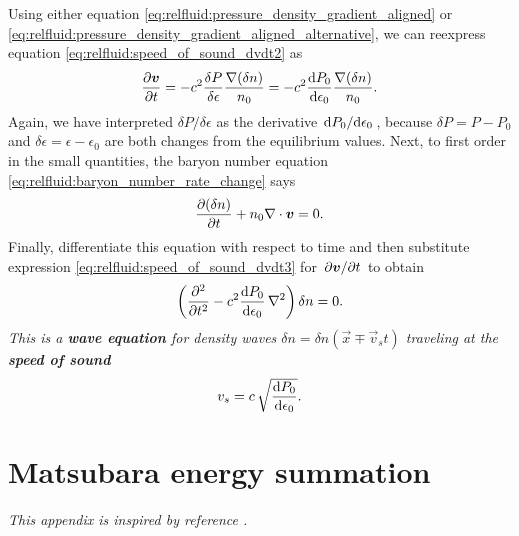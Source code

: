 Using either equation \eqref{eq:relfluid:pressure_density_gradient_aligned} or \eqref{eq:relfluid:pressure_density_gradient_aligned_alternative}, we can reexpress equation \eqref{eq:relfluid:speed_of_sound_dvdt2} as
\begin{equation}
	\pdv{\vec{v}}{t} = -c^2 \frac{\delta P}{\delta \epsilon} \frac{\nabla (\delta n)}{n_0}
	                 = -c^2 \odv{P_0}{\epsilon_0} \frac{\nabla (\delta n)}{n_0} .
\label{eq:relfluid:speed_of_sound_dvdt3}
\end{equation}
Again, we have interpreted $\delta P / \delta \epsilon$ as the derivative $\odv{P_0}/{\epsilon_0}$, because $\delta P = P - P_0$ and $\delta \epsilon = \epsilon - \epsilon_0$ are both changes from the equilibrium values.
Next, to first order in the small quantities, the baryon number equation \eqref{eq:relfluid:baryon_number_rate_change} says
\begin{equation}
	\pdv{(\delta n)}{t} + n_0 \nabla \cdot {\bm{v}} = 0 .
\label{eq:relfluid:speed_of_sound_baryon_number_rate_of_change}
\end{equation}
Finally, differentiate this equation with respect to time and then substitute expression \eqref{eq:relfluid:speed_of_sound_dvdt3} for $\pdv{{\bm{v}}}/{t}$ to obtain
\begin{equation}
	\left( \pdv[2]{}{t} - c^2 \odv{P_0}{\epsilon_0} \, \nabla^2 \right) \delta n = 0 .
\end{equation}
\emph{This is a \textbf{wave equation} for density waves $\delta n = \delta n (\vec{x} \mp \vec{v}_s t)$ traveling at the \textbf{speed of sound}}
\begin{equation}
	v_s = c \, \sqrt{\odv{P_0}{\epsilon_0}} .
\label{eq:relfluid:speed_of_sound}
\end{equation}


\chapter{Matsubara energy summation}
\label{chap:matsum}

\textit{This appendix is inspired by reference \cite{ref:altland_simons}.}

